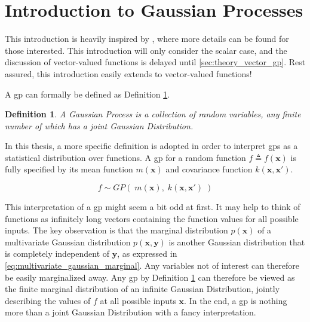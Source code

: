 \section{Introduction to Gaussian Processes}\label{sec:gp}

This introduction is heavily inspired by \cite{rasmussen}, where more details can be found for those interested. This introduction will only consider the scalar case, and the discussion of vector-valued functions is delayed until \cref{sec:theory_vector_gp}. Rest assured, this introduction easily extends to vector-valued functions!

A \acrfull{gp} can formally be defined as Definition \ref{def:gp}.

\newtheorem{gp_def}{Definition}
\begin{gp_def}\label{def:gp}
A Gaussian Process is a collection of random variables, any finite number of which has a joint Gaussian Distribution.
\end{gp_def}

In this thesis, a more specific definition is adopted in order to interpret \acrshort{gp}s as a statistical distribution over functions. A \acrshort{gp} for a random function $f \triangleq f(\boldsymbol{x})$ is fully specified by its mean function $m(\boldsymbol{x})$ and covariance function $k(\boldsymbol{x}, \boldsymbol{x}')$.

\begin{equation}\label{eq:gp}
    f \sim GP(\;m(\boldsymbol{x}), \; k(\boldsymbol{x}, \boldsymbol{x}')\;)
\end{equation}

This interpretation of a \acrshort{gp} might seem a bit odd at first. It may help to think of functions as infinitely long vectors containing the function values for all possible inputs. The key observation is that the marginal distribution $p(\boldsymbol{x})$ of a multivariate Gaussian distribution $p(\boldsymbol{x}, \boldsymbol{y})$ is another Gaussian distribution that is completely independent of $\boldsymbol{y}$, as expressed in \cref{eq:multivariate_gaussian_marginal}. Any variables not of interest can therefore be easily marginalized away. Any \acrshort{gp} by Definition \ref{def:gp} can therefore be viewed as the finite marginal distribution of an infinite Gaussian Distribution, jointly describing the values of $f$ at all possible inputs $\boldsymbol{x}$. In the end, a \acrshort{gp} is nothing more than a joint Gaussian Distribution with a fancy interpretation.

